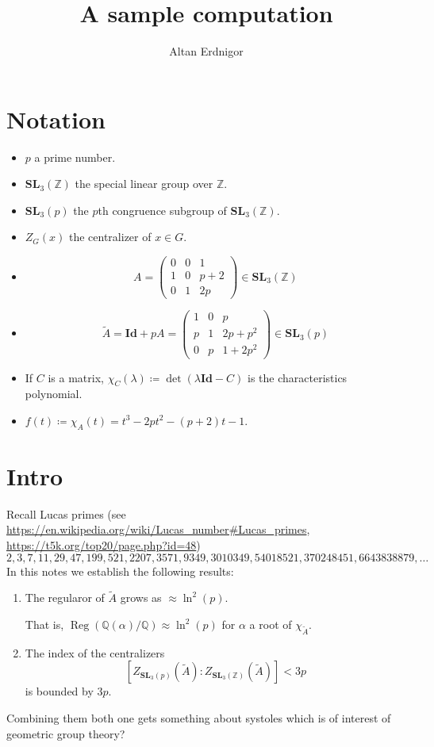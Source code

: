 \documentclass[a4paper]{article}
\DeclareMathOperator{\assign}{\coloneqq}        %
\newcommand{\Q}{\mathbb{Q}}        %
\newcommand{\Id}{\mathbf{Id}}        %
\newcommand{\SL}{\mathbf{SL}_3(\mathbb{Z})}        %
\newcommand{\SLp}{\mathbf{SL}_3(p)}        %
\DeclareMathOperator{\Reg}{Reg}        %
\begin{document}
\title{A sample computation}	
\author{Altan Erdnigor}
\maketitle

\section{Notation}
\begin{itemize}
\item $p$ a prime number.
\item $\SL$ the special linear group over $\mathbb{Z}$.
\item $\SLp$ the $p$th congruence subgroup of $\SL$.
\item $Z_G(x)$ the centralizer of $x \in G$.
\item 
\begin{equation}
\label{matrix_small}
A = 
\begin{pmatrix}
0 & 0 & 1 \\
1 & 0 & p+2 \\
0 & 1 & 2p
\end{pmatrix}
\in \SL
\end{equation}
\item 
\begin{equation}
\label{matrix_big}
\tilde A = \Id + p A =
\begin{pmatrix}
1 & 0 & p \\
p & 1 & 2 p + p^2 \\
0 & p & 1 + 2 p^2
\end{pmatrix}
\in \SLp
\end{equation}

\item If $C$ is a matrix, $\chi_C(\lambda) \assign \det(\lambda \Id - C)$ is the characteristics polynomial.
\item $ f(t) \assign \chi_A(t) = t^3 - 2p t^2 - (p + 2) t - 1$.

\end{itemize}

\section{Intro}
Recall Lucas primes (see \url{https://en.wikipedia.org/wiki/Lucas_number#Lucas_primes}, \url{https://t5k.org/top20/page.php?id=48})
\begin{equation}
	\label{the_primes_sequence}
2, 3, 7, 11, 29, 47, 199, 521, 2207, 3571, 9349, 3010349, 54018521, 370248451, 6643838879, \ldots
\end{equation}
In this notes we establish the following results:
\begin{enumerate}
\item
The regularor of $\tilde A$
grows as $\approx \ln^2(p)$. 

That is, $\Reg ( \Q(\alpha)/\Q ) \approx \ln^2(p) $ for $\alpha$ a root of $\chi_{\tilde A}$.

\item
The index of the centralizers
\[
	[Z_{\SLp}(\tilde A) : Z_{\SL}(\tilde A)] < 3p
\] 
is bounded by $3p$.
\end{enumerate}
Combining them both one gets something about systoles which is of interest of geometric group theory?
\end{document}
